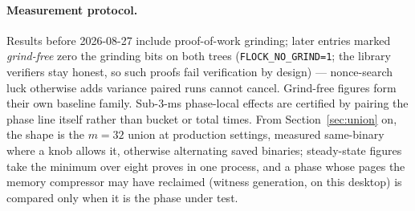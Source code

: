 \documentclass[11pt]{article}
\newcommand{\code}[1]{\texttt{#1}}
\begin{document}
\paragraph{Measurement protocol.} Results before 2026-08-27 include
proof-of-work grinding; later entries marked \emph{grind-free} zero the
grinding bits on both trees (\code{FLOCK\_NO\_GRIND=1}; the library
verifiers stay honest, so such proofs fail verification by design) —
nonce-search luck otherwise adds variance paired runs cannot cancel.
Grind-free figures form their own baseline family. Sub-3-ms phase-local
effects are certified by pairing the phase line itself rather than
bucket or total times. From Section~\ref{sec:union} on, the shape is
the $m{=}32$ union at production settings, measured same-binary where a
knob allows it, otherwise alternating saved binaries; steady-state
figures take the minimum over eight proves in one process, and a phase
whose pages the memory compressor may have reclaimed (witness
generation, on this desktop) is compared only when it is the phase
under test.
\end{document}
